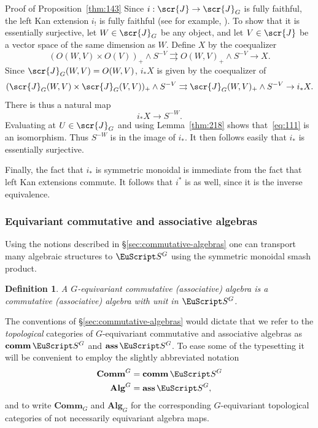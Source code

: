 \documentclass{amsart}
\newtheorem{definition}[equation]{Definition}
\newenvironment{defin}{\begin{definition}\rm}{\end{definition}}
\theoremstyle{definition}
\newtheorem{defin}[equation]{Definition}
\theoremstyle{remark}
\newenvironment{pf*}[1]{\bigskip{\em #1:\/}}{\qed\medskip}
\newcommand{\spectra}{\EuScript S}
\newcommand{\einftycat}{\mathbf{Comm}}
\newcommand{\ainftycat}{\mathbf{Alg}}
\newcommand{\geinftycat}[1]{\einftycat_{#1}}
\newcommand{\gainftycat}[1]{\ainftycat_{#1}}
\newcommand{\ugeinftycat}[1]{\einftycat^{#1}}
\newcommand{\ugainftycat}[1]{\ainftycat^{#1}}
\newcommand{\icat}{\scr{J}}
\newcommand{\igcat}[1]{\icat_{#1}}
\newcommand{\ugspectra}[1]{\spectra^{#1}}
\DeclareMathOperator{\comm}{\mathbf{comm}}
\DeclareMathOperator{\ass}{\mathbf{ass}}
\begin{document}
\begin{pf*}{Proof of Proposition~\ref{thm:143}}
Since $i:\icat\to \igcat{G}$ is fully faithful, the left Kan extension
$i_{!}$ is fully faithful (see for example,
\cite[Corollary~X.3]{MR1712872}).  To show that it is essentially
surjective, let $W\in \igcat{G}$ be any object, and let $V\in \icat$
be a vector space of the same dimension as $W$.  Define $X$ by the
coequalizer
\[
(O(W,V) \times O(V))_{+}\wedge S^{-V}\rightrightarrows
O(W,V)_{+}\wedge S^{-V} \to X.
\]
Since $\igcat{G}(W,V)= O(W,V)$, $i_{\ast}X$ is given by the
coequalizer of
\[
(\igcat{G}(W,V) \times \igcat{G}(V,V))_{+}\wedge S^{-V}\rightrightarrows
\igcat{G}(W,V)_{+}\wedge S^{-V} \to i_{\ast}X.
\]
There is thus a natural map 
\begin{equation}
\label{eq:111}
i_{\ast}X\to S^{-W}.
\end{equation}
Evaluating at $U\in \igcat{G}$ and using Lemma~\ref{thm:218} shows
that~\eqref{eq:111} is an isomorphism.  Thus $S^{-W}$ is in the image
of $i_{\ast}$.  It then follows easily that $i_{\ast}$ is essentially
surjective.

Finally, the fact that $i_{\ast}$ is symmetric monoidal is immediate
from the fact that left Kan extensions commute.  It follows that
$i^{\ast}$ is as well, since it is the inverse equivalence.
\end{pf*}

\subsubsection{Equivariant commutative and associative algebras}
\label{sec:equiv-einfty-ainfty}

Using the notions described in \S\ref{sec:commutative-algebras} one
can transport many algebraic structures to $\ugspectra{G}$ using the
symmetric monoidal smash product.   

\begin{defin}
\label{def:35} A {\em $G$-equivariant commutative (associative)
algebra} is a commutative (associative) algebra with unit in
$\ugspectra G$.  
\end{defin}

The conventions of \S\ref{sec:commutative-algebras} would dictate that
we refer to the {\em topological} categories of $G$-equivariant
commutative and associative algebras as $\comm\ugspectra{G}$ and
$\ass\ugspectra{G}$.   To ease some of the typesetting it
will be convenient to employ the slightly abbreviated notation
\begin{align*}
\ugeinftycat{G} &= \comm\ugspectra{G} \\
\ugainftycat{G} &= \ass\ugspectra{G},
\end{align*}
and to write $\geinftycat{G}$ and $\gainftycat{G}$ for the
corresponding $G$-equivariant topological categories of not
necessarily equivariant algebra maps. 
\end{document}
